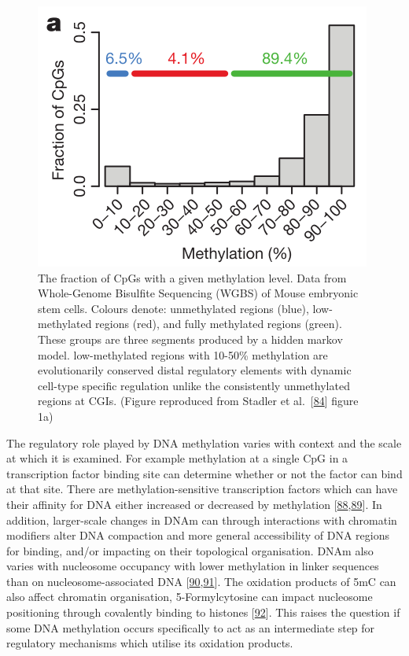 \documentclass[
]{book}
\begin{document}
\begin{figure}

{\centering \includegraphics[width=0.8\linewidth]{figs/CpGfreqVsDNAm} 

}

\caption{The fraction of CpGs with a given methylation level. Data from Whole-Genome Bisulfite Sequencing (WGBS) of Mouse embryonic stem cells. Colours denote: unmethylated regions (blue), low-methylated regions (red), and fully methylated regions (green). These groups are three segments produced by a hidden markov model. low-methylated regions with 10-50\% methylation are evolutionarily conserved distal regulatory elements with dynamic cell-type specific regulation unlike the consistently unmethylated regions at CGIs. (Figure reproduced from Stadler et al.~{[}\protect\hyperlink{ref-Stadler2011}{84}{]} figure 1a)}\label{fig:CpGfreqVsDNAm}
\end{figure}



The regulatory role played by DNA methylation varies with context and the scale at which it is examined.
For example methylation at a single CpG in a transcription factor binding site can determine whether or not the factor can bind at that site.
There are methylation-sensitive transcription factors which can have their affinity for DNA either increased or decreased by methylation {[}\protect\hyperlink{ref-Yin2017}{88},\protect\hyperlink{ref-Zuo2017}{89}{]}.
In addition, larger-scale changes in DNAm can through interactions with chromatin modifiers alter DNA compaction and more general accessibility of DNA regions for binding, and/or impacting on their topological organisation.
DNAm also varies with nucleosome occupancy with lower methylation in linker sequences than on nucleosome-associated DNA {[}\protect\hyperlink{ref-Kelly2012}{90},\protect\hyperlink{ref-Huff2014}{91}{]}.
The oxidation products of 5mC can also affect chromatin organisation, 5-Formylcytosine can impact nucleosome positioning through covalently binding to histones {[}\protect\hyperlink{ref-Raiber2017}{92}{]}.
This raises the question if some DNA methylation occurs specifically to act as an intermediate step for regulatory mechanisms which utilise its oxidation products.
\end{document}
